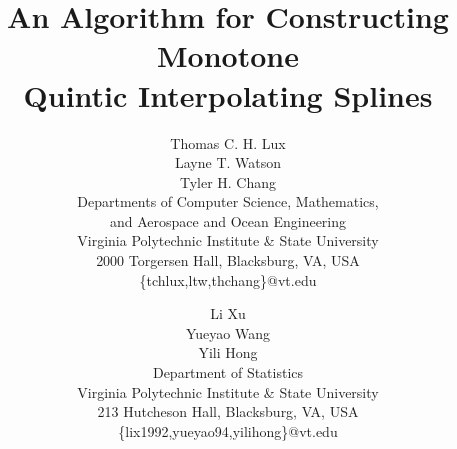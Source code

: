 \documentclass{scspaperproc}
\theoremstyle{scsthe}
\begin{document}
%



\def\SCSconferenceacro{SpringSim'20}

\def\SCSpublicationyear{2020}

\def\SCSconferencedates{May 19-May 21}

\def\SCSconferencevenue{Fairfax, VA, USA}

\title{An Algorithm for Constructing Monotone \\ Quintic Interpolating Splines}

\author{
Thomas C. H. Lux\\
Layne T. Watson\\
Tyler H. Chang\\ [12pt]
Departments of Computer Science, Mathematics,\\
and Aerospace and Ocean Engineering\\
Virginia Polytechnic Institute \& State University\\
2000 Torgersen Hall, Blacksburg, VA, USA\\
\{tchlux,ltw,thchang\}@vt.edu\\
\and
Li Xu\\%
Yueyao Wang\\%
Yili Hong\\ [12pt]
Department of Statistics\\
Virginia Polytechnic Institute \& State University\\
213 Hutcheson Hall, Blacksburg, VA, USA\\
\{lix1992,yueyao94,yilihong\}@vt.edu\\
}
\end{document}
